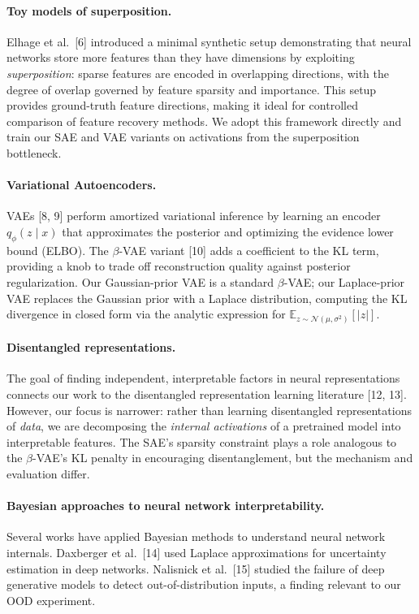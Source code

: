 \documentclass{article}
\begin{document}
\paragraph{Toy models of superposition.}
Elhage et al.~[6] introduced a minimal synthetic setup demonstrating that neural networks store more features than they have dimensions by exploiting \emph{superposition}: sparse features are encoded in overlapping directions, with the degree of overlap governed by feature sparsity and importance. This setup provides ground-truth feature directions, making it ideal for controlled comparison of feature recovery methods. We adopt this framework directly and train our SAE and VAE variants on activations from the superposition bottleneck.

\paragraph{Variational Autoencoders.}
VAEs [8, 9] perform amortized variational inference by learning an encoder $q_\phi(z \mid x)$ that approximates the posterior and optimizing the evidence lower bound (ELBO). The $\beta$-VAE variant [10] adds a coefficient to the KL term, providing a knob to trade off reconstruction quality against posterior regularization. Our Gaussian-prior VAE is a standard $\beta$-VAE; our Laplace-prior VAE replaces the Gaussian prior with a Laplace distribution, computing the KL divergence in closed form via the analytic expression for $\mathbb{E}_{z\sim\mathcal{N}(\mu,\sigma^2)}[|z|]$.

\paragraph{Disentangled representations.}
The goal of finding independent, interpretable factors in neural representations connects our work to the disentangled representation learning literature [12, 13]. However, our focus is narrower: rather than learning disentangled representations of \emph{data}, we are decomposing the \emph{internal activations} of a pretrained model into interpretable features. The SAE's sparsity constraint plays a role analogous to the $\beta$-VAE's KL penalty in encouraging disentanglement, but the mechanism and evaluation differ.

\paragraph{Bayesian approaches to neural network interpretability.}
Several works have applied Bayesian methods to understand neural network internals. Daxberger et al.~[14] used Laplace approximations for uncertainty estimation in deep networks. Nalisnick et al.~[15] studied the failure of deep generative models to detect out-of-distribution inputs, a finding relevant to our OOD experiment.
\end{document}
